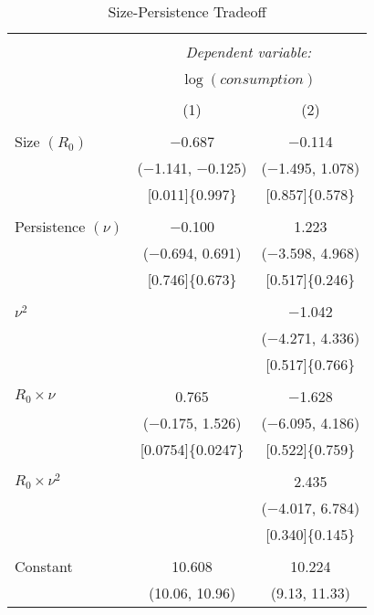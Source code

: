 \documentclass[12pt]{article}
\numberwithin{equation}{section}
\begin{document}
\begin{table}[!htbp] \centering \footnotesize
    \begin{threeparttable}
    \caption{Size-Persistence Tradeoff} 
    \label{tab:Size-Persistence} 
    \begin{tabular}{@{\extracolsep{6pt}}lcc} 
      \\[-1.8ex]\hline 
      \hline \\[-1.8ex] 
       & \multicolumn{2}{c}{\textit{Dependent variable:}} \\ 
      \cline{2-3} 
      \\[-1.8ex] & \multicolumn{2}{c}{$\log(\mathit{consumption})$} \\ 
      \\[-1.8ex] & (1) & (2)\\ 
      \hline \\[-1.8ex] 
       Size $(R_0)$  & $-$0.687 & $-$0.114 \\ 
        & ($-$1.141, $-$0.125) & ($-$1.495, 1.078)    \\ 
        &[0.011]\{0.997\} & [0.857]\{0.578\}\\ 
        & & \\ 
       Persistence $(\nu)$ & $-$0.100 & 1.223 \\ 
        & ($-$0.694,  0.691)   & ($-$3.598, 4.968)    \\ 
        &[0.746]\{0.673\} & [0.517]\{0.246\}\\ 
        & & \\ 
        $\nu^2$ &  & $-$1.042 \\ 
        &  &  ($-$4.271, 4.336) \\ 
        & &[0.517]\{0.766\} \\ 
        & & \\ 
       $R_0\times \nu$ & 0.765 & $-$1.628 \\ 
        & ($-$0.175,  1.526)    &   ($-$6.095,  4.186)     \\ 
        &[0.0754]\{0.0247\} & [0.522]\{0.759\}\\ 
        & & \\ 
        $R_0\times \nu^2$ &  & 2.435 \\ 
        &  &  ($-$4.017, 6.784) \\ 
        & & [0.340]\{0.145\}\\ 
        & & \\ 
       Constant & 10.608 & 10.224 \\ 
        & (10.06, 10.96) & (9.13, 11.33)    \\ 

\end{tabular}
\end{threeparttable}
\end{table}
\end{document}
